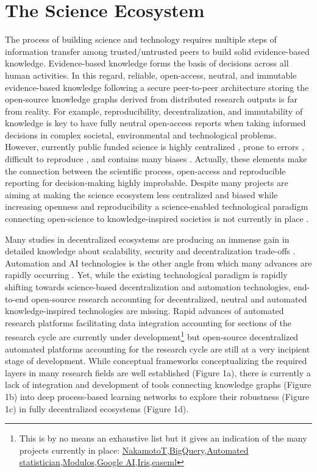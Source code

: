\documentclass[10pt, a4paper, twocolumn]{article} %
\begin{document}
\section{The Science Ecosystem}
The process of building science and technology requires multiple steps
of information transfer among trusted/untrusted peers to build solid
evidence-based knowledge. Evidence-based knowledge forms the basis of
decisions across all human activities. In this regard, reliable,
open-access, neutral, and immutable evidence-based knowledge following
a secure peer-to-peer architecture storing the open-source knowledge
graphs derived from distributed research outputs is far from
reality. For example, reproducibility, decentralization, and
immutability of knowledge is key to have fully neutral open-access
reports when taking informed decisions in complex societal,
environmental and technological problems. However, currently public
funded science is highly centralized \citep{Inhaber1977,Gunter2018}⁠⁠,
prone to errors \citep{Fang2011}, difficult to reproduce
\citep{Hardwicke2018}, and contains many biases
\citep{Ioannidis2005}. Actually, these elements make the connection
between the scientific process, open-access and reproducible reporting
for decision-making highly improbable. Despite many projects are
aiming at making the science ecosystem less centralized and biased
while increasing openness and reproducibility a science-enabled
technological paradigm connecting open-science to knowledge-inspired
societies is not currently in place \citep{Gunther2018}.

Many studies in decentralized ecosystems are producing an immense gain
in detailed knowledge about scalability, security and decentralization
trade-offs
\citep{Golem2016,Durov2017,Androulaki2018,OceanProtocolFoundation2018,BigchainDBGmbH2018}. Automation
and AI technologies is the other angle from which many advances are
rapidly occurring \citep{Schmidhuber:2015,Reichstein,Gil2019}. Yet,
while the existing technological paradigm is rapidly shifting towards
science-based decentralization and automation technologies, end-to-end
open-source research accounting for decentralized, neutral and
automated knowledge-inspired technologies are missing. Rapid advances
of automated research platforms facilitating data integration
accounting for sections of the research cycle are currently under
development\footnote{This is by no means an exhaustive list but it
  gives an indication of the many projects currently in place:
  \href{https://www.nterminal.com}{NakamotoT},\href{https://cloud.google.com/bigquery/}{BigQuery},\href{https://www.automaticstatistician.com/index/}{Automated
    statistician},\href{http://www.modulos.ai/}{Modulos},\href{https://ai.google/}{Google
    AI},\href{https://iris.ai}{Iris},\href{https://github.com/DS3Lab/easeml}{easeml}}
but open-source decentralized automated platforms accounting for the
research cycle are still at a very incipient stage of
development. While conceptual frameworks conceptualizing the required
layers in many research fields are well established (Figure 1a), there
is currently a lack of integration and development of tools connecting
knowledge graphs (Figure 1b) into deep process-based learning networks
to explore their robustness (Figure 1c) in fully decentralized
ecosystems (Figure 1d).
\end{document}
